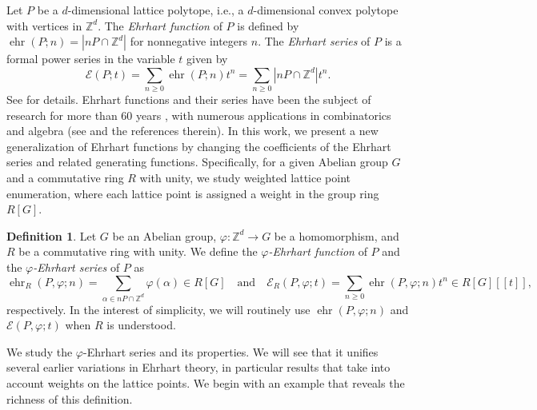 \documentclass[12pt,reqno]{amsart}
\theoremstyle{definition}
\newtheorem{definition}[thm]{Definition}
\theoremstyle{remark}
\newcommand{\Z}{\mathbb{Z}}
\renewcommand{\phi}{\varphi}
\DeclareMathOperator{\ehr}{ehr}
\begin{document}
Let $P$ be a $d$-dimensional lattice polytope, i.e., a $d$-dimensional convex polytope with vertices in $\Z^d$.
The {\it Ehrhart function} 
of $P$ is defined by $\ehr(P;n) = |nP\cap \Z^d|$ for nonnegative integers $n$.
The {\it Ehrhart series} of $P$ is a formal power series in the variable $t$ given by
$$\mathcal E(P;t) = \sum_{n\geq 0}\ehr(P;n)t^n=\sum_{n\geq 0} |nP\cap \Z^d|t^n.$$  
See \cite{barvinokzurichbook, beckrobins,stanley-1996-comb-comm-algebra,stanley} for details. Ehrhart functions and their series have been the subject of research for more than 60 years \cite{Ehrhart1962}, with numerous applications in combinatorics and algebra (see \cite{barvinokzurichbook, beckrobins,HibiBook} and the 
references therein). In this work, we present a new generalization of Ehrhart functions by changing the coefficients of the Ehrhart series and related generating functions. Specifically, for a given Abelian group $G$ and a commutative ring $R$ with unity, we study weighted lattice point enumeration, where each lattice point is assigned a weight in the group ring $R[G]$.



\begin{definition}
Let $G$ be an Abelian group, $\phi:\Z^d \to G$ be a homomorphism, and $R$ be a 
commutative ring with unity. We define the {\it $\phi$-Ehrhart function}  of $P$ and the {\it $\phi$-Ehrhart series} of $P$ as
$$\ehr_R(P,\varphi;n) = \sum_{\alpha \in nP \cap \Z^d}\varphi(\alpha) \in R[G] \quad \text{and} \quad \mathcal E_R(P,\varphi;t) = \sum_{n\geq 0}\ehr(P,\phi;n)t^n \in R[G][[t]],$$
respectively. In the interest of simplicity, we will routinely use $\ehr(P,\varphi;n)$ and $\mathcal E(P,\varphi;t)$ when $R$ is understood.


\end{definition}

We study the $\phi$-Ehrhart series and its properties. We will see that it unifies several earlier variations in Ehrhart theory, in particular results that take into account weights on the lattice points. We begin with an example that reveals the richness of this definition. 
\end{document}
